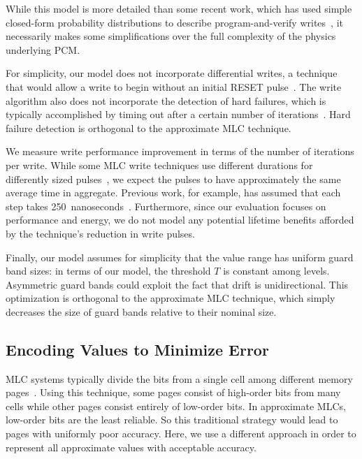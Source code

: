 While this model is more detailed than some recent work, which has used simple
closed-form probability distributions to describe program-and-verify
writes~\cite{improvingwrites,writecancel}, it necessarily makes some
simplifications over the full complexity of the physics underlying PCM.

For simplicity, our model does not incorporate differential writes, a
technique that would allow a write to begin without an initial
RESET pulse~\cite{improvingwrites}. The write algorithm also does not
incorporate the detection of hard failures, which is typically
accomplished by timing out after a certain number of
iterations~\cite{mlcflash}. Hard failure detection is orthogonal to
the approximate MLC technique.

We measure write performance improvement in terms of the number of
iterations per write. While some MLC write techniques use different
durations for differently sized pulses~\cite{mlcmodelchar,partialreset,mlcwritestrategies}, we expect the
pulses to have approximately the same average time in aggregate.
Previous work, for example, has assumed that each step takes
250~nanoseconds~\cite{writecancel,improvingwrites}.
Furthermore, since our evaluation focuses on performance and energy, we do not
model any potential lifetime benefits afforded by the technique's reduction in
write pulses.

Finally, our model assumes for simplicity that the value range has
uniform guard band sizes: in terms of our model, the threshold $T$ is
constant among levels.
Asymmetric
guard bands could exploit the fact that drift is unidirectional.
This optimization is orthogonal to the approximate MLC technique,
which simply decreases the size of guard bands relative to their
nominal size.

\subsection{Encoding Values to Minimize Error}
\label{approxstorage:sec:coding}

MLC systems typically divide the bits from a single cell among different
memory pages~\cite{mlcflash}.
Using this technique, some pages consist of high-order bits from many cells
while other pages consist entirely of low-order bits. In approximate MLCs,
low-order bits are the least reliable. So this traditional strategy would lead
to pages with uniformly poor accuracy.
Here, we use a different approach in
order to represent all approximate values with acceptable accuracy.


